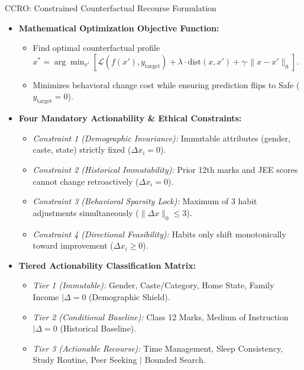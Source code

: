 \documentclass{beamer}
\begin{document}
\begin{frame}[t]{CCRO: Constrained Counterfactual Recourse Formulation}
  \begin{itemize}\setlength{\itemsep}{2pt}\scriptsize
    \item \textbf{Mathematical Optimization Objective Function:}
    \begin{itemize}\setlength{\itemsep}{1pt}\tiny
      \item Find optimal counterfactual profile $x^* = \arg\min_{x'} [ \mathcal{L}(f(x'), y_{\text{target}}) + \lambda \cdot \text{dist}(x, x') + \gamma \cdot \|x - x'\|_0 ]$.
      \item Minimizes behavioral change cost while ensuring prediction flips to Safe ($y_{\text{target}} = 0$).
    \end{itemize}
    \item \textbf{Four Mandatory Actionability \& Ethical Constraints:}
    \begin{itemize}\setlength{\itemsep}{2pt}\footnotesize
      \item \textit{Constraint 1 (Demographic Invariance):} Immutable attributes (gender, caste, state) strictly fixed ($\Delta x_i = 0$).
      \item \textit{Constraint 2 (Historical Immutability):} Prior 12th marks and JEE scores cannot change retroactively ($\Delta x_i = 0$).
      \item \textit{Constraint 3 (Behavioral Sparsity Lock):} Maximum of 3 habit adjustments simultaneously ($\|\Delta x\|_0 \le 3$).
      \item \textit{Constraint 4 (Directional Feasibility):} Habits only shift monotonically toward improvement ($\Delta x_i \ge 0$).
    \end{itemize}
    \item \textbf{Tiered Actionability Classification Matrix:}
    \begin{itemize}\setlength{\itemsep}{2pt}\footnotesize
      \item \textit{Tier 1 (Immutable):} Gender, Caste/Category, Home State, Family Income $\mid \Delta = 0$ (Demographic Shield).
      \item \textit{Tier 2 (Conditional Baseline):} Class 12 Marks, Medium of Instruction $\mid \Delta = 0$ (Historical Baseline).
      \item \textit{Tier 3 (Actionable Recourse):} Time Management, Sleep Consistency, Study Routine, Peer Seeking $\mid$ Bounded Search.
    \end{itemize}
  \end{itemize}
\end{frame}
\end{document}
